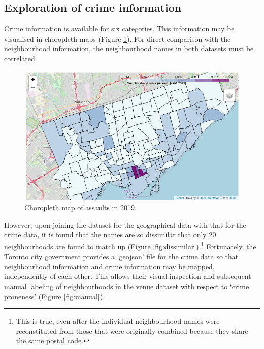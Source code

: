 \documentclass{article}
\begin{document}
\subsection{Exploration of crime information}
Crime information is available for six categories. This information may be visualised in choropleth maps (Figure \ref{fig:assault}). For direct comparison with the neighbourhood information, the neighbourhood names in both datasets must be correlated.
\begin{figure}[ht]
 \includegraphics[width=\textwidth]{pics/assault.png}
 \caption{Choropleth map of assaults in 2019.}\label{fig:assault}
\end{figure}
However, upon joining the dataset for the geographical data with that for the crime data, it is found that the names are so dissimilar that only 20 neighbourhoods are found to match up (Figure \ref{fig:dissimilar}).\footnote{This is true, even after the individual neighbourhood names were reconstituted from those that were originally combined because they share the same postal code.} Fortunately, the Toronto city government provides a `geojson' file for the crime data so that neighbourhood information and crime information may be mapped, independently of each other. This allows their visual inspection and subsequent manual labeling of neighbourhoods in the venue dataset with respect to `crime proneness' (Figure \ref{fig:manual}). 
\end{document}
